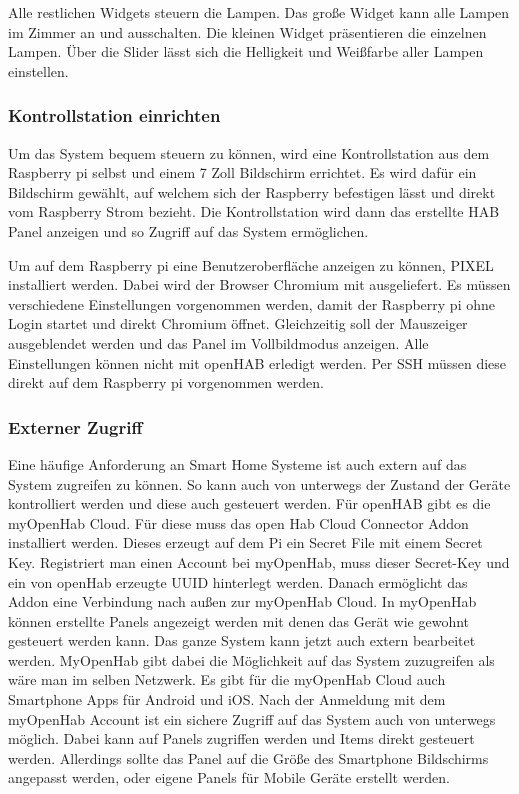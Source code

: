		Alle restlichen Widgets steuern die Lampen. Das große Widget kann alle Lampen im Zimmer an und ausschalten. Die kleinen Widget präsentieren die einzelnen Lampen. Über die Slider lässt sich die Helligkeit und Weißfarbe aller Lampen einstellen.
		
		\subsubsection{Kontrollstation einrichten}
		Um das System bequem steuern zu können, wird eine Kontrollstation aus dem Raspberry pi selbst und einem 7 Zoll Bildschirm errichtet. Es wird dafür ein Bildschirm gewählt, auf welchem sich der Raspberry befestigen lässt und direkt vom Raspberry Strom bezieht.
		Die Kontrollstation wird dann das erstellte HAB Panel anzeigen und so Zugriff auf das System ermöglichen.

		Um auf dem Raspberry pi eine Benutzeroberfläche anzeigen zu können, PIXEL installiert werden. Dabei wird der Browser Chromium mit ausgeliefert. Es müssen verschiedene Einstellungen vorgenommen werden, damit der Raspberry pi ohne Login startet und direkt Chromium öffnet. Gleichzeitig soll der Mauszeiger ausgeblendet werden und das Panel im Vollbildmodus anzeigen. Alle Einstellungen können nicht mit openHAB erledigt werden. Per SSH müssen diese direkt auf dem Raspberry pi vorgenommen werden.

		\subsubsection{Externer Zugriff}
		Eine häufige Anforderung an Smart Home Systeme ist auch extern auf das System zugreifen zu können. So kann auch von unterwegs der Zustand der Geräte kontrolliert werden und diese auch gesteuert werden. Für openHAB gibt es die myOpenHab Cloud. Für diese muss das open Hab Cloud Connector Addon installiert werden. Dieses erzeugt auf dem Pi ein Secret File mit einem Secret Key. Registriert man einen Account bei myOpenHab, muss dieser Secret-Key und ein von openHab erzeugte UUID hinterlegt werden. Danach ermöglicht das Addon eine Verbindung nach außen zur myOpenHab Cloud.
		In myOpenHab können erstellte Panels angezeigt werden mit denen das Gerät wie gewohnt gesteuert werden kann. Das ganze System kann jetzt auch extern bearbeitet werden. MyOpenHab gibt dabei die Möglichkeit auf das System zuzugreifen als wäre man im selben Netzwerk.
		Es gibt für die myOpenHab Cloud auch Smartphone Apps für Android und iOS. Nach der Anmeldung mit dem myOpenHab Account ist ein sichere Zugriff auf das System auch von unterwegs möglich. Dabei kann auf Panels zugriffen werden und Items direkt gesteuert werden. Allerdings sollte das Panel auf die Größe des Smartphone Bildschirms angepasst werden, oder eigene Panels für Mobile Geräte erstellt werden.
		
